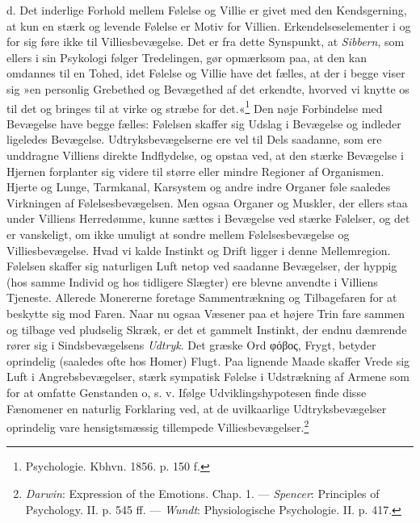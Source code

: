 \documentclass[12pt,a4paper,openany]{book}
\newcommand{\opage}[1]{\marginnote{\footnotesize\textit{[#1]}}}
\begin{document}
d. Det inderlige Forhold mellem Følelse og Villie er givet med den
Kendsgerning, at kun en stærk og levende Følelse er Motiv for Villien.
Erkendelseselementer i og for
\opage{117}sig føre ikke til Villiesbevægelse. Det er fra dette
Synspunkt, at \emph{Sibbern}, som ellers i sin Psykologi følger
Tredelingen, gør opmærksom paa, at den kan omdannes til en Tohed, idet
Følelse og Villie have det fælles, at der i begge viser sig »en
personlig Grebethed og Bevægethed af det erkendte, hvorved vi knytte os
til det og bringes til at virke og stræbe for
det.«\footnote[1]{Psychologie. Kbhvn. 1856. p. 150 f.} Den nøje
Forbindelse med Bevægelse have begge fælles: Følelsen skaffer sig Udslag
i Bevægelse og indleder ligeledes Bevægelse. Udtryksbevægelserne ere vel
til Dels saadanne, som ere unddragne Villiens direkte Indflydelse, og
opstaa ved, at den stærke Bevægelse i Hjernen forplanter sig videre til
større eller mindre Regioner af Organismen. Hjerte og Lunge, Tarmkanal,
Karsystem og andre indre Organer føle saaledes Virkningen af
Følelsesbevægelsen. Men ogsaa Organer og Muskler, der ellers staa under
Villiens Herredømme, kunne sættes i Bevægelse ved stærke Følelser, og
det er vanskeligt, om ikke umuligt at sondre mellem Følelsesbevægelse og
Villiesbevægelse. Hvad vi kalde Instinkt og Drift ligger i denne
Mellemregion. Følelsen skaffer sig naturligen Luft netop ved saadanne
Bevægelser, der hyppig (hos samme Individ og hos tidligere Slægter) ere
blevne anvendte i Villiens Tjeneste. Allerede Monererne foretage
Sammentrækning og Tilbagefaren for at beskytte sig mod Faren. Naar nu
ogsaa Væsener paa et højere Trin fare sammen og tilbage ved pludselig
Skræk, er det et gammelt Instinkt, der endnu dæmrende rører sig i
Sindsbevægelsens \emph{Udtryk}. Det græske Ord φόβος, Frygt, betyder
oprindelig (saaledes ofte hos Homer) Flugt. Paa lignende Maade skaffer
Vrede sig Luft i Angrebsbevægelser, stærk sympatisk Følelse i
Udstrækning af Armene som for at omfatte Genstanden o, s. v. Ifølge
Udviklingshypotesen finde disse Fænomener en naturlig Forklaring ved, at
de uvilkaarlige Udtryksbevægelser oprindelig vare hensigtsmæssig
tillempede Villiesbevægelser.\footnote[2]{\emph{Darwin}: Expression of the Emotions. Chap. 1. --- \emph{Spencer}: Principles of Psychology. II. p. 545 ff. --- \emph{Wundt}: Physiologische Psychologie. II. p. 417.}
\end{document}

